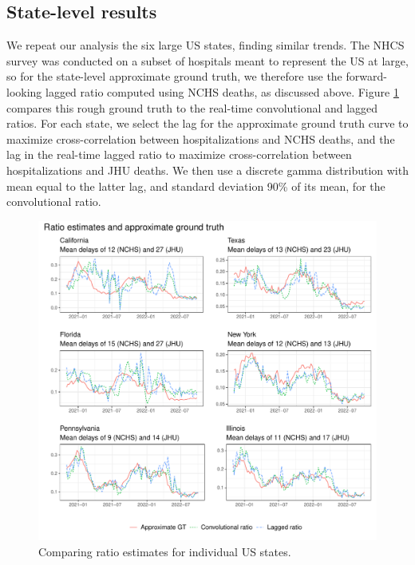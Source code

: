 \documentclass{article}
\begin{document}

\subsection{State-level results}

We repeat our analysis the six large US states, finding similar trends. The NHCS
survey was conducted on a subset of hospitals meant to represent the US at
large, so for the state-level approximate ground truth, we therefore use the
forward-looking lagged ratio computed using NCHS deaths, as discussed above.
Figure \ref{fig:state-level} compares this rough ground truth to the real-time 
convolutional and lagged ratios. For each state, we select the lag for the
approximate ground truth curve to maximize cross-correlation between
hospitalizations and NCHS deaths, and the lag in the real-time lagged ratio to
maximize cross-correlation between hospitalizations and JHU deaths. We then use
a discrete gamma distribution with mean equal to the latter lag, and standard
deviation 90\% of its mean, for the convolutional ratio.

\begin{figure}[htbp]
\centering
\includegraphics[width=\linewidth]{Figures/Real/state_level_hfrs.pdf}
\caption{Comparing ratio estimates for individual US states.} 
\label{fig:state-level}
 \end{figure}
\end{document}
